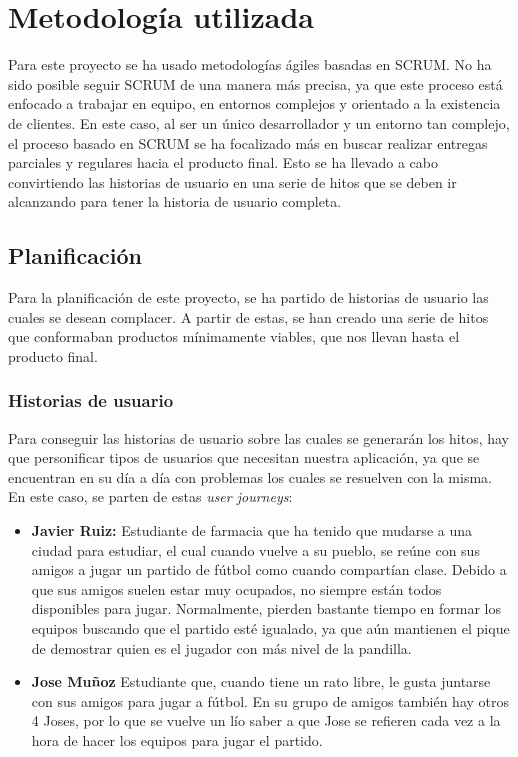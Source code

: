 \chapter{Metodología utilizada}

Para este proyecto se ha usado metodologías ágiles basadas en SCRUM. No ha sido posible seguir SCRUM de una manera más precisa, ya que este proceso está enfocado a trabajar en
equipo, en entornos complejos y orientado a la existencia de clientes. En este caso, al ser un único desarrollador y un entorno tan complejo, el proceso basado en SCRUM se ha
focalizado más en buscar realizar entregas parciales y regulares hacia el producto final. Esto se ha llevado a cabo convirtiendo las historias de usuario en una serie de hitos
que se deben ir alcanzando para tener la historia de usuario completa.\\

\section{Planificación}

Para la planificación de este proyecto, se ha partido de historias de usuario las cuales se desean complacer. A partir de estas, se han creado una serie de hitos que conformaban productos mínimamente viables,
 que nos llevan hasta el producto final.

\subsection{Historias de usuario}

Para conseguir las historias de usuario sobre las cuales se generarán los hitos, hay que personificar tipos de usuarios que necesitan nuestra aplicación, ya que se encuentran en su día a día
con problemas los cuales se resuelven con la misma. En este caso, se parten de estas \textit{user journeys}:

\newpage

\begin{itemize}
    \item \textbf{Javier Ruiz:} Estudiante de farmacia que ha tenido que mudarse a una ciudad para estudiar, el cual cuando vuelve a su pueblo,
     se reúne con sus amigos a jugar un partido de fútbol como cuando compartían clase. Debido a que sus amigos suelen estar muy ocupados,
     no siempre están todos disponibles para jugar. Normalmente, pierden bastante tiempo en formar los equipos buscando que el partido esté igualado,
     ya que aún mantienen el pique de demostrar quien es el jugador con más nivel de la pandilla. 
    \item \textbf{Jose Muñoz} Estudiante que, cuando tiene un rato libre, le gusta juntarse con sus amigos para jugar a fútbol. En su grupo de amigos también hay otros 4 Joses, por lo que
    se vuelve un lío saber a que Jose se refieren cada vez a la hora de hacer los equipos para jugar el partido.
\end{itemize}

